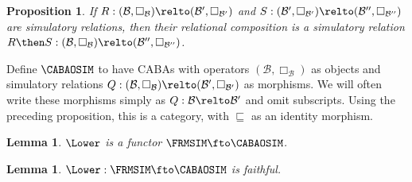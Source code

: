 \documentclass[10pt,a4paper]{article}
\newtheorem{lemma}[theorem]{Lemma}
\newtheorem{proposition}[theorem]{Proposition}
\begin{document}
\begin{proposition}
  \label{proposition:simulatory-compose}
  If
  \(R : (\mathcal{B}, \Box_\mathcal{B}) \relto (\mathcal{B}',
  \Box_{\mathcal{B}'})\) and
  \(S : (\mathcal{B}', \Box_{\mathcal{B}'}) \relto (\mathcal{B}'',
  \Box_{\mathcal{B}''})\) are simulatory relations, then their relational
  composition is a simulatory relation
  \(R \then S : (\mathcal{B}, \Box_\mathcal{B}) \relto (\mathcal{B}'',
  \Box_{\mathcal{B}''})\).
\end{proposition}

Define \(\CABAOSIM\) to have CABAs with operators \((\mathcal{B},
\Box_\mathcal{B})\) as objects and simulatory relations
\(Q : (\mathcal{B}, \Box_\mathcal{B}) \relto (\mathcal{B}',
\Box_{\mathcal{B}'})\) as morphisms. We will often write these
morphisms simply as \(Q : \mathcal{B} \relto \mathcal{B}'\) and omit
subscripts. Using the preceding proposition, this is a category, with
\(\sqsubseteq\) as an identity morphism.

\begin{lemma}
  \label{lemma:lower-frmsim-functor}
  \(\Lower\) is a functor \(\FRMSIM \fto \CABAOSIM\).
\end{lemma}

\begin{lemma}
  \label{lemma:lower-frmsim-faithful}
  \(\Lower : \FRMSIM \fto \CABAOSIM\) is faithful.
\end{lemma}
\end{document}
